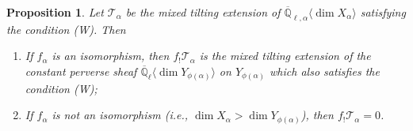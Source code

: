 \documentclass{amsart}
\theoremstyle{plain}
\newtheorem{prop}[subsubsection]{Proposition}
\theoremstyle{definition}
\theoremstyle{remark}
\numberwithin{equation}{subsection}
\begin{document}
\begin{prop}\label{p:wpush}
Let ${\mathcal{T}}_\alpha$ be {\em the} mixed tilting extension of ${\overline{\mathbb{Q}}_{\ell,\alpha}{\langle{{\dim X_\alpha}}\rangle}}$ satisfying the condition \textup{(W)}. Then
\begin{enumerate}[(1)]
\item If $f_\alpha$ is an isomorphism, then $f_!{\mathcal{T}}_\alpha$ is {\em the} mixed tilting extension of the constant perverse sheaf ${\overline{\mathbb{Q}}_{\ell}}{\langle{{\dim Y_{\phi(\alpha)}}}\rangle}$ on $Y_{\phi(\alpha)}$ which also satisfies the condition (W);
\item If $f_\alpha$ is not an isomorphism (i.e., $\dim X_\alpha>\dim Y_{\phi(\alpha)}$), then $f_!{\mathcal{T}}_\alpha=0$.
\end{enumerate}
\end{prop}
\end{document}

